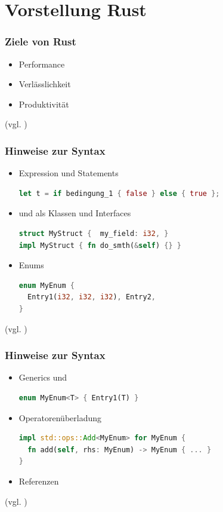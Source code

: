 \documentclass{beamer}
\begin{document}
\section{Vorstellung Rust}
\begin{frame}[fragile]
  \frametitle{Ziele von Rust}
  \begin{itemize}
    \item Performance
    \pause
    \item Verlässlichkeit
    \pause
    \item Produktivität
  \end{itemize}
  {\small (vgl. \cite{WhyRust} \cite[S. 196 ff.]{SK19} \cite{JavaGenerics})}
\end{frame}

\begin{frame}[fragile]
  \frametitle{Hinweise zur Syntax}
  \begin{itemize}
    \item Expression und Statements \begin{lstlisting}[language=rust]
let t = if bedingung_1 { false } else { true };\end{lstlisting}
    \pause
    \item {} und  als Klassen und Interfaces \begin{lstlisting}[language=rust]
struct MyStruct {  my_field: i32, }
impl MyStruct { fn do_smth(&self) {} }\end{lstlisting}
    \pause
    \item Enums \begin{lstlisting}[language=rust]
enum MyEnum {
  Entry1(i32, i32, i32), Entry2,
}\end{lstlisting}
  \end{itemize}
  {\small (vgl. \cite[S. 122 ff.]{BO18})}
\end{frame}

\begin{frame}[fragile]
  \frametitle{Hinweise zur Syntax}
  \begin{itemize}
    \item Generics und  \begin{lstlisting}[language=rust]
enum MyEnum<T> { Entry1(T) }\end{lstlisting}
    \pause
    \item Operatorenüberladung \begin{lstlisting}[language=rust]
impl std::ops::Add<MyEnum> for MyEnum {
  fn add(self, rhs: MyEnum) -> MyEnum { ... }
}\end{lstlisting}
    \pause
    \item Referenzen
  \end{itemize}
  {\small (vgl. \cite[S. 196 ff.]{SK19} \cite{TraitBoundariesEx} \cite[S. 246 ff.]{BO18})}
\end{frame}
\end{document}
